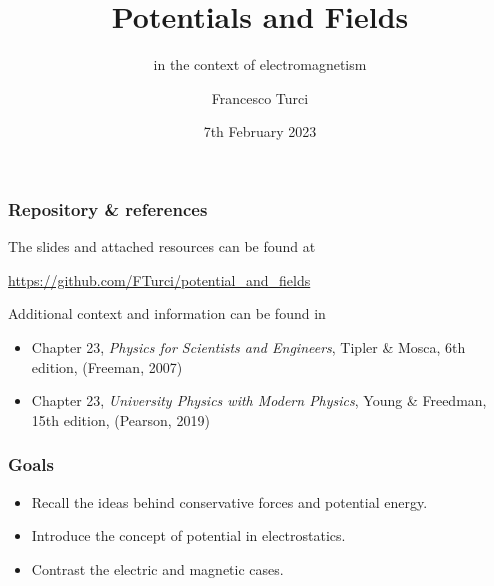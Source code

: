 \documentclass{beamer}
\title[Short Title]{Potentials and Fields}
\subtitle{in the context of electromagnetism}
\author{Francesco Turci}
\institute{School of Physics}
\date{7th February 2023}
\begin{document}


\begin{frame}[leftcolor=white,rightcolor=UniversityRed,div=0.8\paperwidth]
  \titlepage
\end{frame}



\begin{frame}
\frametitle{Repository \& references}
The slides and attached resources can be found at

{\color{UniversityRed}\href{https://github.com/FTurci/potential_and_fields}{https://github.com/FTurci/potential\_and\_fields}}\newline

Additional context and information can be found in
\begin{itemize}
	\item Chapter 23, \textit{Physics for Scientists and Engineers}, Tipler \& Mosca, 6th edition, 
(Freeman, 2007) 
\item Chapter 23, \textit{University Physics with Modern Physics}, 
Young \& Freedman, 15th edition, (Pearson, 2019) 
\end{itemize}
\end{frame}

\begin{frame}
	\frametitle{Goals}
	\begin{itemize}
		\item Recall the ideas behind conservative forces and potential energy.
		\item Introduce the concept of potential in electrostatics.
		\item Contrast the electric and magnetic cases. 
	\end{itemize}
\end{frame}
\end{document}
